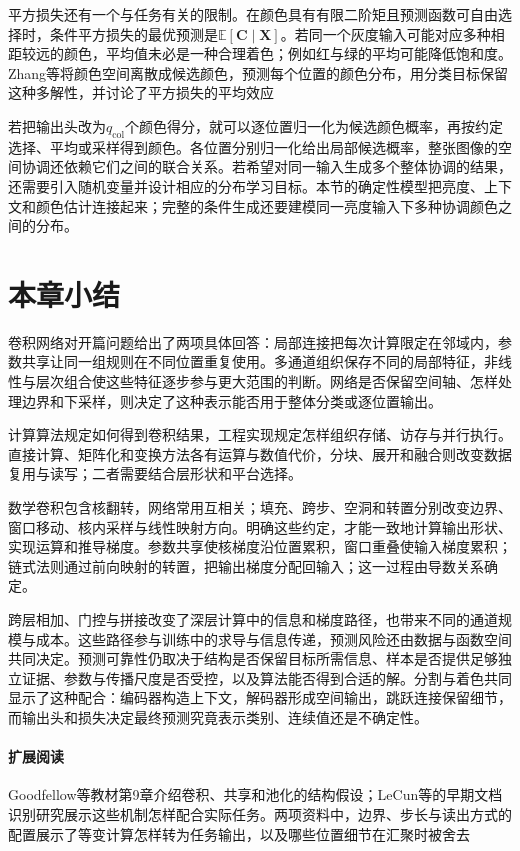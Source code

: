 平方损失还有一个与任务有关的限制。在颜色具有有限二阶矩且预测函数可自由选择时，条件平方损失的最优预测是$\mathbb E[\bm C\mid\bm X]$。若同一个灰度输入可能对应多种相距较远的颜色，平均值未必是一种合理着色；例如红与绿的平均可能降低饱和度。Zhang等将颜色空间离散成候选颜色，预测每个位置的颜色分布，用分类目标保留这种多解性，并讨论了平方损失的平均效应

若把输出头改为$q_{\mathrm{col}}$个颜色得分，就可以逐位置归一化为候选颜色概率，再按约定选择、平均或采样得到颜色。各位置分别归一化给出局部候选概率，整张图像的空间协调还依赖它们之间的联合关系。若希望对同一输入生成多个整体协调的结果，还需要引入随机变量并设计相应的分布学习目标。本节的确定性模型把亮度、上下文和颜色估计连接起来；完整的条件生成还要建模同一亮度输入下多种协调颜色之间的分布。

\section{本章小结}
\label{sec:cnn-summary}

卷积网络对开篇问题给出了两项具体回答：局部连接把每次计算限定在邻域内，参数共享让同一组规则在不同位置重复使用。多通道组织保存不同的局部特征，非线性与层次组合使这些特征逐步参与更大范围的判断。网络是否保留空间轴、怎样处理边界和下采样，则决定了这种表示能否用于整体分类或逐位置输出。

计算算法规定如何得到卷积结果，工程实现规定怎样组织存储、访存与并行执行。直接计算、矩阵化和变换方法各有运算与数值代价，分块、展开和融合则改变数据复用与读写；二者需要结合层形状和平台选择。

数学卷积包含核翻转，网络常用互相关；填充、跨步、空洞和转置分别改变边界、窗口移动、核内采样与线性映射方向。明确这些约定，才能一致地计算输出形状、实现运算和推导梯度。参数共享使核梯度沿位置累积，窗口重叠使输入梯度累积；链式法则通过前向映射的转置，把输出梯度分配回输入；这一过程由导数关系确定。

跨层相加、门控与拼接改变了深层计算中的信息和梯度路径，也带来不同的通道规模与成本。这些路径参与训练中的求导与信息传递，预测风险还由数据与函数空间共同决定。预测可靠性仍取决于结构是否保留目标所需信息、样本是否提供足够独立证据、参数与传播尺度是否受控，以及算法能否得到合适的解。分割与着色共同显示了这种配合：编码器构造上下文，解码器形成空间输出，跳跃连接保留细节，而输出头和损失决定最终预测究竟表示类别、连续值还是不确定性。

\paragraph{扩展阅读}
Goodfellow等教材第9章介绍卷积、共享和池化的结构假设；LeCun等的早期文档识别研究展示这些机制怎样配合实际任务。两项资料中，边界、步长与读出方式的配置展示了等变计算怎样转为任务输出，以及哪些位置细节在汇聚时被舍去
